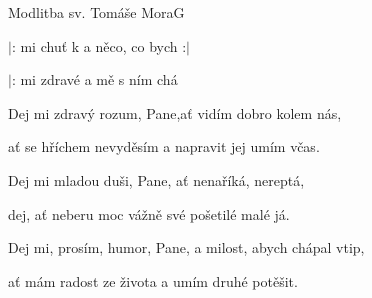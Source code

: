 \begin{song}{Modlitba sv. Tomáše Mora}{G}{}

\begin{SBVerse}

$|$:  mi chuť k   a  něco, co bych :$|$

$|$:  mi zdravé   a  mě s ním chá

\end{SBVerse}

\begin{SBVerse}

Dej mi zdravý rozum, Pane,ať vidím dobro kolem nás,

ať se hříchem nevyděsím a napravit jej umím včas.

\end{SBVerse}

\begin{SBVerse}

Dej mi mladou duši, Pane, ať nenaříká, nereptá,

dej, ať neberu moc vážně své pošetilé malé já.

\end{SBVerse}

\begin{SBVerse}

Dej mi, prosím, humor, Pane, a milost, abych chápal vtip,

ať mám radost ze života a umím druhé potěšit.

\end{SBVerse}

\end{song}
\pagebreak
